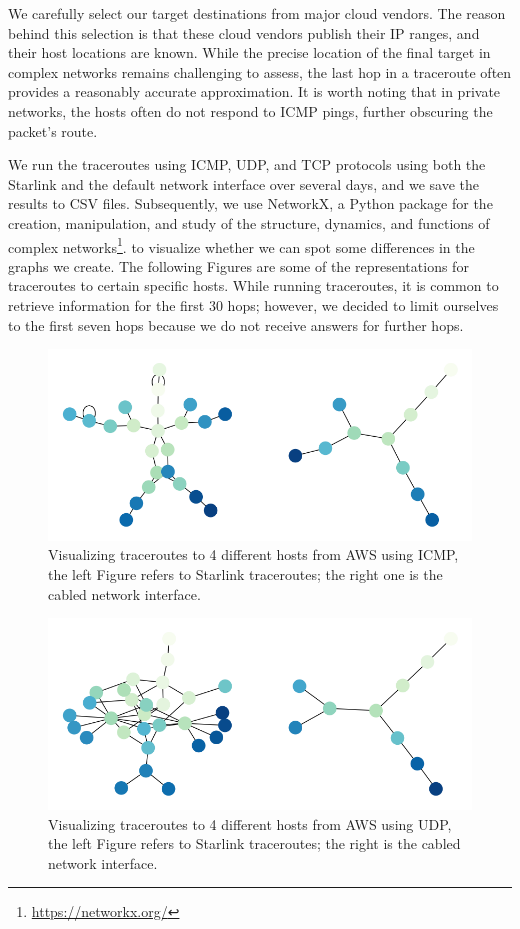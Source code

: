 \documentclass[]{report}
\begin{document}
We carefully select our target destinations from major cloud vendors. The reason behind this selection is that these
cloud vendors publish their IP ranges, and their host locations are known. While the precise location of the final
target in complex networks remains challenging to assess, the last hop in a traceroute often provides a reasonably
accurate approximation. It is worth noting that in private networks, the hosts often do not respond to ICMP pings,
further obscuring the packet's route.

We run the traceroutes using ICMP, UDP, and TCP protocols using both the Starlink and the default network interface over
several days, and we save the results to CSV files. Subsequently, we use NetworkX, a Python package for the creation,
manipulation, and study of the structure, dynamics, and functions of complex
networks\footnote{\url{https://networkx.org/}}. to visualize whether we can spot some differences in the graphs we
create. 
The following Figures are some of the representations for traceroutes to certain specific hosts. While running
traceroutes, it is common to retrieve information for the first 30 hops; however, we decided to limit ourselves to the
first seven hops because we do not receive answers for further hops. 

\begin{figure}
    \label{fig:tr_aws_icmp}
    \centering
    \includegraphics[width=0.6\columnwidth]{img/tr_aws_icmp.png}
    \caption{Visualizing traceroutes to 4 different hosts from AWS using ICMP, the left Figure refers to Starlink traceroutes; the right one is the cabled network interface.}
\end{figure}
    
\begin{figure}
    \label{fig:tr_aws_udp}
    \centering
    \includegraphics[width=0.6\columnwidth]{img/tr_aws_udp.png}
    \caption{Visualizing traceroutes to 4 different hosts from AWS using UDP, the left Figure refers to Starlink traceroutes; the right is the cabled network interface.}
\end{figure}
    
\end{document}
